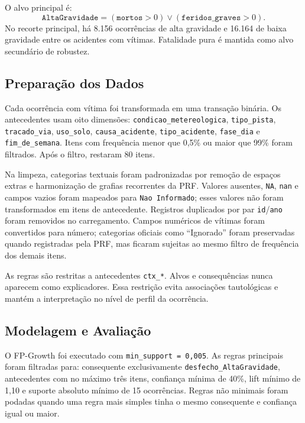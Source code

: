 \documentclass[12pt]{article}
\begin{document}
O alvo principal é:
\[
\texttt{AltaGravidade} = (\texttt{mortos} > 0) \lor (\texttt{feridos\_graves} > 0).
\]
No recorte principal, há 8.156 ocorrências de alta gravidade e 16.164 de baixa gravidade entre os acidentes com vítimas. Fatalidade pura é mantida como alvo secundário de robustez.

\subsection{Preparação dos Dados}

Cada ocorrência com vítima foi transformada em uma transação binária. Os antecedentes usam oito dimensões: \texttt{condicao\_metereologica}, \texttt{tipo\_pista}, \texttt{tracado\_via}, \texttt{uso\_solo}, \texttt{causa\_acidente}, \texttt{tipo\_acidente}, \texttt{fase\_dia} e \texttt{fim\_de\_semana}. Itens com frequência menor que 0,5\% ou maior que 99\% foram filtrados. Após o filtro, restaram 80 itens.

Na limpeza, categorias textuais foram padronizadas por remoção de espaços extras e harmonização de grafias recorrentes da PRF. Valores ausentes, \texttt{NA}, \texttt{nan} e campos vazios foram mapeados para \texttt{Nao Informado}; esses valores não foram transformados em itens de antecedente. Registros duplicados por par \texttt{id}/\texttt{ano} foram removidos no carregamento. Campos numéricos de vítimas foram convertidos para número; categorias oficiais como ``Ignorado'' foram preservadas quando registradas pela PRF, mas ficaram sujeitas ao mesmo filtro de frequência dos demais itens.

As regras são restritas a antecedentes \texttt{ctx\_*}. Alvos e consequências nunca aparecem como explicadores. Essa restrição evita associações tautológicas e mantém a interpretação no nível de perfil da ocorrência.

\subsection{Modelagem e Avaliação}

O FP-Growth foi executado com \texttt{min\_support = 0,005}. As regras principais foram filtradas para: consequente exclusivamente \texttt{desfecho\_AltaGravidade}, antecedentes com no máximo três itens, confiança mínima de 40\%, lift mínimo de 1,10 e suporte absoluto mínimo de 15 ocorrências. Regras não minimais foram podadas quando uma regra mais simples tinha o mesmo consequente e confiança igual ou maior.
\end{document}
